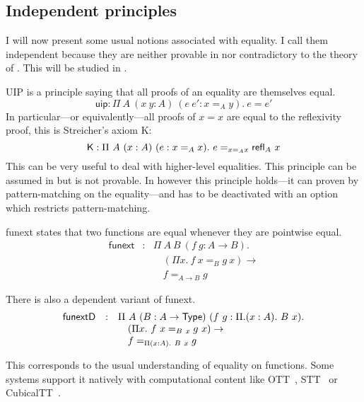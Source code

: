 \subsection{Independent principles}

I will now present some usual notions associated with equality. I call them
independent because they are neither provable in nor contradictory to the theory
of \Coq. This will be studied in .


\acrshort{UIP} is a principle saying that all proofs of an equality are
themselves equal.
\[
  \mathsf{uip} : \Pi\ A\ (x\ y : A)\ (e \ e' : x =_A y).\ e = e'
\]
In particular---or equivalently---all proofs of \(x = x\) are equal to the
reflexivity proof, this is Streicher's axiom K:
\[
  \mathsf{K} : \Pi\ A\ (x : A)\ (e : x =_A x).\ e =_{x =_A x} {\mathsf{refl}}_{A}\  x
\]
This can be very useful to deal with higher-level equalities.
This principle can be assumed in \Coq but is not provable. In \Agda however this
principle holds---it can proven by pattern-matching on the equality---and has to
be deactivated with an option~ which restricts
pattern-matching.


\Acrshort{funext} states that two functions are equal whenever they are
pointwise equal.
\[
  \begin{array}{lcl}
    \mathsf{funext} &:&
    \Pi\ A\ B\ (f\ g : A \to B).\\
    && \quad (\Pi x.\ f\ x =_B g\ x) \to \\
    && \quad f =_{A \to B} g
  \end{array}
\]

There is also a dependent variant of \acrshort{funext}.
\[
  \begin{array}{lcl}
    \mathsf{funextD} &:&
    \Pi\ A\ (B : A \to \mathsf{Type})\ (f\ g : \Pi. (x : A).\ B\ x).\\
    && \quad (\Pi x.\ f\ x =_{B\ x} g\ x) \to \\
    && \quad f =_{\Pi (x:A).\ B\ x} g
  \end{array}
\]

This corresponds to the usual understanding of equality on functions.
Some systems support it natively with computational content like
\acrfull{OTT}~,
\acrfull{STT}~ or
\acrfull{CubicalTT}~.


